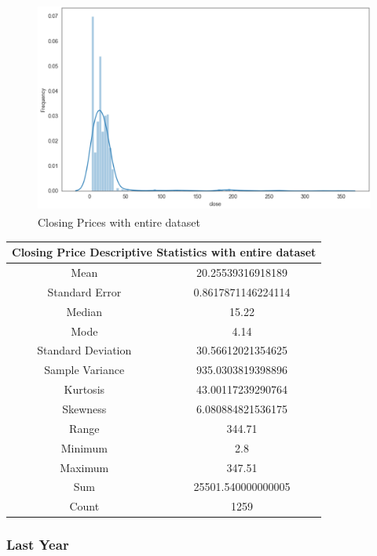 \begin{figure}[h!]
    \centering
    \includegraphics[width=15cm,height=7cm,keepaspectratio]{resultsEvaluation/closeDescMax.png}
    \caption{Closing Prices with entire dataset}
    \label{fig:appendix_closeDescMax}
\end{figure}
\begin{center}
\begin{tabular}{ c c }
\hline
\multicolumn{2}{|c|}{Closing Price Descriptive Statistics with entire dataset} \\
\hline
Mean & 20.25539316918189 \\
Standard Error & 0.8617871146224114 \\
Median & 15.22 \\
Mode & 4.14 \\
Standard Deviation & 30.56612021354625 \\
Sample Variance & 935.0303819398896 \\
Kurtosis & 43.00117239290764 \\
Skewness & 6.080884821536175 \\
Range & 344.71 \\
Minimum & 2.8 \\
Maximum & 347.51 \\
Sum & 25501.540000000005 \\
Count & 1259  
\end{tabular}
\end{center}

\subsubsection{Last Year}

